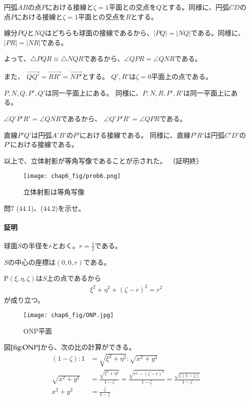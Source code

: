 円弧$AB$の点$P$における接線と$\zeta=1$平面との交点を$Q$とする。同様に、円弧$CD$の点$P$における接線と$\zeta=1$平面との交点を$R$とする。

線分$PQ$と$NQ$はどちらも球面の接線であるから、$|PQ|=|NQ|$である。同様に、$|PR|=|NR|$である。

よって、$\triangle PQR\equiv\triangle NQR$であるから、$\angle QPR=\angle QNR$である。

また、
$\overrightarrow{QQ'}
=\overrightarrow{RR'}
=\overrightarrow{NP'}$とする。
$Q',R'$は$\zeta=0$平面上の点である。

$P,N,Q,P',Q'$は同一平面上にある。
同様に、$P,N,R,P',R'$は同一平面上にある。

$\angle Q'P'R'=\angle QNR$であるから、
$\angle Q'P'R'=\angle QPR$である。

直線$P'Q'$は円弧$A'B'$の$P'$における接線である。
同様に、直線$P'R'$は円弧$C'D'$の$P'$における接線である。

以上で、立体射影が等角写像であることが示された。
（証明終）

\begin{figure}[h]
    \centering
    \texttt{[image: chap6\_fig/prob6.png]}
    \caption{立体射影は等角写像}
    \label{fig:prob6}
\end{figure}

\newpage
\begin{mysimplebox}{問7}
    (44.1)、(44.2)を示せ。
\end{mysimplebox}
\paragraph{証明}
球面$S$の半径を$r$とおく。$r=\frac{1}{2}$である。

$S$の中心の座標は$(0,0,r)$である。

P$(\xi,\eta,\zeta)$は$S$上の点であるから
\begin{align*}
    \xi^2+\eta^2+(\zeta-r)^2=r^2
\end{align*}
が成り立つ。

\begin{figure}[h]
    \centering
    \texttt{[image: chap6\_fig/ONP.jpg]}
    \caption{ONP平面}
    \label{fig:ONP}
\end{figure}

図$\ref{fig:ONP}$から、次の比の計算ができる。
\begin{align*}
    (1-\zeta):1&=\sqrt{\xi^2+\eta^2}:\sqrt{x^2+y^2}\\
    \sqrt{x^2+y^2}&=\frac{\sqrt{\xi^2+\eta^2}}{1-\zeta}
    =\frac{\sqrt{r^2-(\zeta-r)^2}}{1-\zeta}
    =\frac{\sqrt{\zeta(1-\zeta)}}{1-\zeta}\\
    x^2+y^2&=\frac{\zeta}{1-\zeta}
\end{align*}

